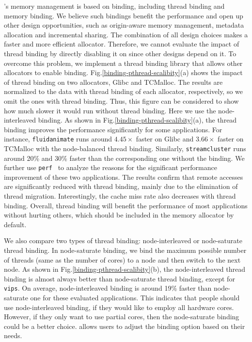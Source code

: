 \NM{}'s memory management is based on binding, including thread binding and memory binding. We believe such bindings benefit the performance and open up other design opportunities, such as origin-aware memory management, metadata allocation and incremental sharing. The combination of all design choices makes \NM{} a faster and more efficient allocator. Therefore, we cannot evaluate the impact of thread binding by directly disabling it on \NM{} since other designs depend on it. To overcome this problem, we implement a thread binding library that allows other allocators to enable binding.
Fig.\ref{binding-pthread-scalibity}(a) shows the impact of thread binding on two allocators, Glibc and TCMalloc.
The results are normalized to the data with thread binding of each allocator, respectively, so we omit the ones with thread binding. Thus, this figure can be considered to show how much slower it would run without thread binding.
Here we use the node-interleaved binding. As shown in Fig.\ref{binding-pthread-scalibity}(a), the thread binding improves the performance significantly for some applications. For instance, \texttt{fluidanimate} runs around $4.45\times$ faster on Glibc and $3.66\times$ faster on TCMalloc with the node-balanced thread binding. Similarly, \texttt{streamcluster} runs around 20\% and 30\% faster than the corresponding one without the binding. 
We further use \texttt{perf}~\cite{perfweb} to analyze the reasons for the significant performance improvement of these two applications. The results confirm that remote accesses are significantly reduced with thread binding, mainly due to the elimination of thread migration. Interestingly, the cache miss rate also decreases with thread binding. Overall, thread binding will benefit the performance of most applications without hurting others,
which should be included in the memory allocator by default. 


We also compare two types of thread binding: node-interleaved or node-saturate thread binding. In node-saturate binding, we bind the maximum possible number of threads (same as the number of cores) to a node and then switch to the next node. As shown in Fig.\ref{binding-pthread-scalibity}(b), the node-interleaved thread binding is almost always better than node-saturate thread binding, except for \texttt{vips}. On average, node-interleaved binding is around 19\% faster than node-saturate one for these evaluated applications. This indicates that people should use node-interleaved binding, if they would like to employ all hardware cores. However, if they only want to use partial cores, then the node-saturate binding could be a better choice. \NM{} allows users to adjust the binding option based on their needs.

